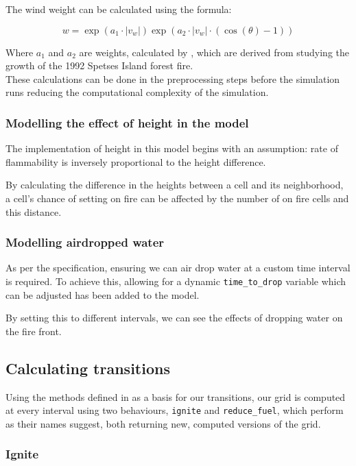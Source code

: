 \documentclass[11pt, a4paper, titlepage]{article}
\newcommand{\code}[1]{\colorbox{light-gray}{\texttt{#1}}}
\begin{document}
The wind weight can be calculated using the formula:

\[w = \exp{(a_1 \cdot |v_w|)} \exp{(a_2 \cdot |v_w| \cdot (\cos(\theta) - 1))}\]

Where $a_1$ and $a_2$ are weights, calculated by \cite{ALEXANDRIDIS2008191}, which are derived from studying the growth of the 1992 Spetses Island forest fire.\\
These calculations can be done in the preprocessing steps before the simulation runs reducing the computational complexity of the simulation.

\subsubsection{Modelling the effect of height in the model}
The implementation of height in this model begins with an assumption: rate of flammability is inversely proportional to the height difference.

By calculating the difference in the heights between a cell and its neighborhood, a cell's chance of setting on fire can be affected by the number of on fire cells and this distance.

\subsubsection{Modelling airdropped water}
As per the specification, ensuring we can air drop water at a custom time interval is required. To achieve this, allowing for a dynamic \code{time\_to\_drop} variable which can be adjusted has been added to the model.

By setting this to different intervals, we can see the effects of dropping water on the fire front.

\subsection{Calculating transitions}

Using the methods defined in \cite{ALEXANDRIDIS2008191} as a basis for our transitions, our grid is computed at every interval using two behaviours, \code{ignite} and \code{reduce\_fuel}, which perform as their names suggest, both returning new, computed versions of the grid.

\subsubsection{Ignite}
\end{document}
